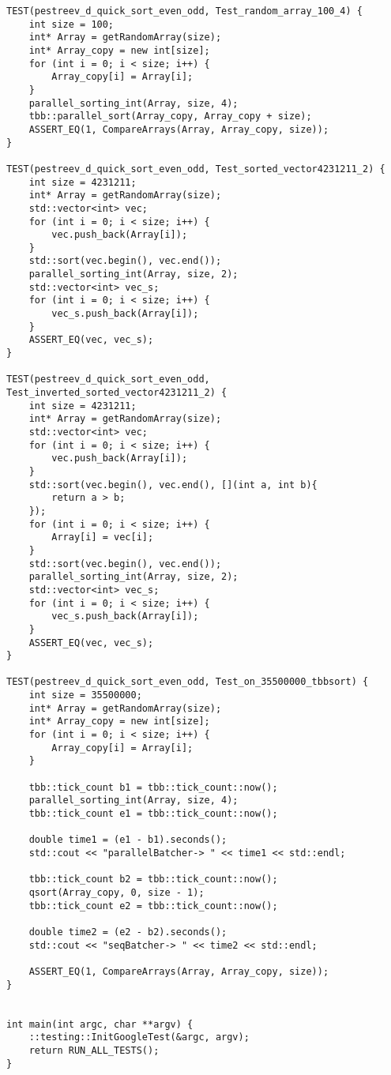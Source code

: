 \documentclass{report}
\begin{document}
\begin{lstlisting}
TEST(pestreev_d_quick_sort_even_odd, Test_random_array_100_4) {
    int size = 100;
    int* Array = getRandomArray(size);
    int* Array_copy = new int[size];
    for (int i = 0; i < size; i++) {
        Array_copy[i] = Array[i];
    }
    parallel_sorting_int(Array, size, 4);
    tbb::parallel_sort(Array_copy, Array_copy + size);
    ASSERT_EQ(1, CompareArrays(Array, Array_copy, size));
}

TEST(pestreev_d_quick_sort_even_odd, Test_sorted_vector4231211_2) {
    int size = 4231211;
    int* Array = getRandomArray(size);
    std::vector<int> vec;
    for (int i = 0; i < size; i++) {
        vec.push_back(Array[i]);
    }
    std::sort(vec.begin(), vec.end());
    parallel_sorting_int(Array, size, 2);
    std::vector<int> vec_s;
    for (int i = 0; i < size; i++) {
        vec_s.push_back(Array[i]);
    }
    ASSERT_EQ(vec, vec_s);
}

TEST(pestreev_d_quick_sort_even_odd, Test_inverted_sorted_vector4231211_2) {
    int size = 4231211;
    int* Array = getRandomArray(size);
    std::vector<int> vec;
    for (int i = 0; i < size; i++) {
        vec.push_back(Array[i]);
    }
    std::sort(vec.begin(), vec.end(), [](int a, int b){
        return a > b;
    });
    for (int i = 0; i < size; i++) {
        Array[i] = vec[i];
    }
    std::sort(vec.begin(), vec.end());
    parallel_sorting_int(Array, size, 2);
    std::vector<int> vec_s;
    for (int i = 0; i < size; i++) {
        vec_s.push_back(Array[i]);
    }
    ASSERT_EQ(vec, vec_s);
}

TEST(pestreev_d_quick_sort_even_odd, Test_on_35500000_tbbsort) {
    int size = 35500000;
    int* Array = getRandomArray(size);
    int* Array_copy = new int[size];
    for (int i = 0; i < size; i++) {
        Array_copy[i] = Array[i];
    }

    tbb::tick_count b1 = tbb::tick_count::now();
    parallel_sorting_int(Array, size, 4);
    tbb::tick_count e1 = tbb::tick_count::now();

    double time1 = (e1 - b1).seconds();
    std::cout << "parallelBatcher-> " << time1 << std::endl;

    tbb::tick_count b2 = tbb::tick_count::now();
    qsort(Array_copy, 0, size - 1);
    tbb::tick_count e2 = tbb::tick_count::now();

    double time2 = (e2 - b2).seconds();
    std::cout << "seqBatcher-> " << time2 << std::endl;

    ASSERT_EQ(1, CompareArrays(Array, Array_copy, size));
}


int main(int argc, char **argv) {
    ::testing::InitGoogleTest(&argc, argv);
    return RUN_ALL_TESTS();
}

\end{lstlisting}
\end{document}
